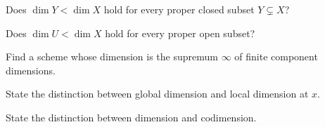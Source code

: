 \begin{exercise}[VI.30.E22]\label{exer:vi30-22}
Does $\dim Y<\dim X$ hold for every proper closed subset $Y\subsetneq X$?
\end{exercise}

\begin{exercise}[VI.30.E23]\label{exer:vi30-23}
Does $\dim U<\dim X$ hold for every proper open subset?
\end{exercise}

\begin{exercise}[VI.30.E24]\label{exer:vi30-24}
Find a scheme whose dimension is the supremum $\infty$ of finite component dimensions.
\end{exercise}

\begin{exercise}[VI.30.E25]\label{exer:vi30-25}
State the distinction between global dimension and local dimension at $x$.
\end{exercise}

\begin{exercise}[VI.30.E26]\label{exer:vi30-26}
State the distinction between dimension and codimension.
\end{exercise}